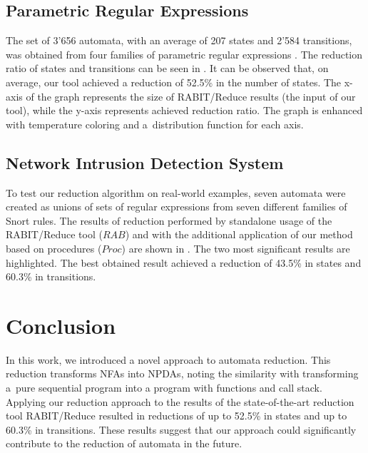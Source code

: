 \documentclass{ExcelAtFIT}
\begin{document}
	\subsection{Parametric Regular Expressions}
		The set of 3'656 automata, with an average of 207 states and 2'584 transitions, was obtained from four families of parametric regular expressions \cite{Regex_param}. The reduction ratio of states and transitions can be seen in . It can be observed that, on average, our tool achieved a reduction of 52.5\% in the number of states. The x-axis of the graph represents the size of RABIT/Reduce results (the input of our tool), while the y-axis represents achieved reduction ratio. The graph is enhanced with temperature coloring and a~distribution function for each axis.

	\subsection{Network Intrusion Detection System}
		To test our reduction algorithm on real-world examples, seven automata were created as unions of sets of regular expressions from seven different families of Snort rules. The results of reduction performed by standalone usage of the RABIT/Reduce tool ($RAB$) and with the additional application of our method based on procedures ($\mathit{Proc}$) are shown in . The two most significant results are highlighted. The best obtained result achieved a reduction of 43.5\% in states and 60.3\% in transitions.

\section{Conclusion}
	In this work, we introduced a novel approach to automata reduction. This reduction transforms NFAs into NPDAs, noting the similarity with transforming a~pure sequential program into a program with functions and call stack. Applying our reduction approach to the results of the state-of-the-art reduction tool RABIT/Reduce resulted in reductions of up to 52.5\% in states and up to 60.3\% in transitions. These results suggest that our approach could significantly contribute to the reduction of automata in the future.






\end{document}
